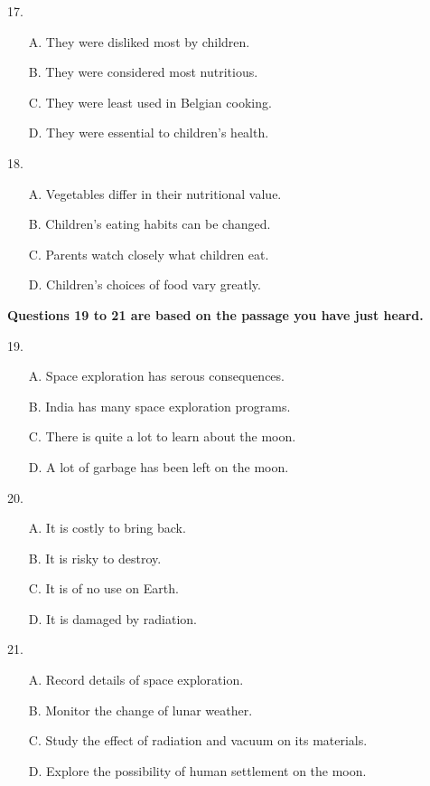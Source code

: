 \documentclass[UTF8,11pt]{ctexart}
\begin{document}
17.


\begin{itemize}[leftmargin=2em,itemsep=.2em,topsep=.4em]\item[A.] They were disliked most by children.
\item[B.] They were considered most nutritious.
\item[C.] They were least used in Belgian cooking.
\item[D.] They were essential to children’s health.
\end{itemize}

18.


\begin{itemize}[leftmargin=2em,itemsep=.2em,topsep=.4em]\item[A.] Vegetables differ in their nutritional value.
\item[B.] Children’s eating habits can be changed.
\item[C.] Parents watch closely what children eat.
\item[D.] Children’s choices of food vary greatly.
\end{itemize}

\textbf{Questions 19 to 21 are based on the passage you have just heard.}


19.


\begin{itemize}[leftmargin=2em,itemsep=.2em,topsep=.4em]\item[A.] Space exploration has serous consequences.
\item[B.] India has many space exploration programs.
\item[C.] There is quite a lot to learn about the moon.
\item[D.] A lot of garbage has been left on the moon.
\end{itemize}

20.


\begin{itemize}[leftmargin=2em,itemsep=.2em,topsep=.4em]\item[A.] It is costly to bring back.
\item[B.] It is risky to destroy.
\item[C.] It is of no use on Earth.
\item[D.] It is damaged by radiation.
\end{itemize}

21.


\begin{itemize}[leftmargin=2em,itemsep=.2em,topsep=.4em]\item[A.] Record details of space exploration.
\item[B.] Monitor the change of lunar weather.
\item[C.] Study the effect of radiation and vacuum on its materials.
\item[D.] Explore the possibility of human settlement on the moon.
\end{itemize}
\end{document}
